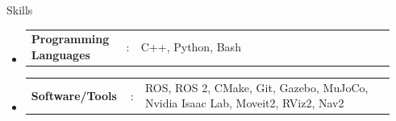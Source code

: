 \documentclass{resume}
\newcommand{\resumeHeadingListStart}{
  \begin{itemize}[leftmargin=0.15in, label={}]
    
}
\newcommand{\resumeHeadingListEnd}{\end{itemize}}
\newcommand{\resumeSectionType}[3]{
  \hspace{-1.3em}\item\begin{tabular*}{0.5\textwidth}[t]{
    p{0.25\linewidth}p{0.02\linewidth}p{0.67\linewidth}
  }
  \normalsize
    \textbf{#1} & #2 & {#3}
  \end{tabular*}\vspace{-8pt}
}
\begin{document}


\begin{rSection}{Skills}
\resumeHeadingListStart{}
\resumeSectionType{Programming Languages}{:}{C++, Python, Bash}
\resumeSectionType{Software/Tools}{:}{ROS, ROS 2, CMake, Git, Gazebo, MuJoCo, Nvidia Isaac Lab, Moveit2, RViz2, Nav2}
\resumeHeadingListEnd{}
\end{rSection}






\newpage
\thispagestyle{reference}
\end{document}
